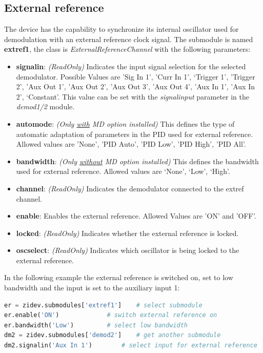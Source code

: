 \documentclass[11pt]{article} %
\begin{document}
\subsection{External reference}
The device has the capability to synchronize its internal oscillator used for demodulation with an external reference clock signal. The submodule is named {\bf extref1}, the class is {\it ExternalReferenceChannel} with the following parameters:
\begin{itemize}
\item {\bf signalin}: {\it (ReadOnly)} Indicates the input signal selection for the selected demodulator. Possible Values are 'Sig In 1', 'Curr In 1', `Trigger 1', 'Trigger 2', 'Aux Out 1', 'Aux Out 2', 'Aux Out 3', 'Aux Out 4', 'Aux In 1', 'Aux In 2', `Constant'. This value can be set with the {\it signalinput} parameter in the {\it demod1/2} module.
\item {\bf automode}: {\it (Only \underline{with} MD option installed)} This defines the type of automatic adaptation of parameters in the PID used for external reference. Allowed values are 'None', 'PID Auto', 'PID Low', 'PID High', 'PID All'.
\item {\bf bandwidth}: {\it (Only \underline{without} MD option installed)} This defines the bandwidth used for external reference. Allowed values are `None', `Low', `High'.
\item {\bf channel}: {\it (ReadOnly)} Indicates the demodulator connected to the extref channel.
\item {\bf enable}: Enables the external reference. Allowed Values are 'ON' and 'OFF'.
\item {\bf locked}: {\it (ReadOnly)} Indicates whether the external reference is locked.
\item {\bf oscselect}: {\it (ReadOnly)} Indicates which oscillator is being locked to the external reference.
\end{itemize}
In the following example the external reference is switched on, set to low bandwidth and the input is set to the auxiliary input 1:
\begin{lstlisting}[frame=single, language=Python]
er = zidev.submodules['extref1']	# select submodule
er.enable('ON')				# switch external reference on
er.bandwidth('Low')			# select low bandwidth
dm2 = zidev.submodules['demod2']	# get another submodule
dm2.signalin('Aux In 1')		# select input for external reference
\end{lstlisting}
\end{document}
